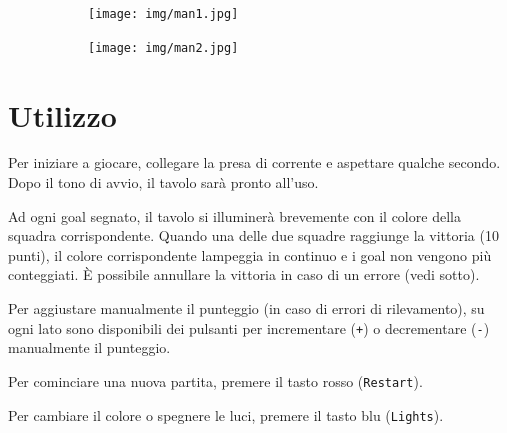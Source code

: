 \documentclass[12pt]{article}
\begin{document}
      	\begin{figure}[H]
        		\begin{subfigure}{0.5\textwidth}
                \texttt{[image: img/man1.jpg]}
        \end{subfigure}
        \begin{subfigure}{0.5\textwidth}
                \texttt{[image: img/man2.jpg]}
         \end{subfigure}
	\end{figure}
		
		

\section{Utilizzo}

	Per iniziare a giocare, collegare la presa di corrente e aspettare qualche secondo. Dopo il tono di avvio, il tavolo sarà pronto all'uso.
	
	Ad ogni goal segnato, il tavolo si illuminerà brevemente con il colore della squadra corrispondente. Quando una delle due squadre raggiunge la vittoria (10 punti), il colore corrispondente lampeggia in continuo e i goal non vengono più conteggiati. È possibile annullare la vittoria in caso di un errore (vedi sotto).
	
	Per aggiustare manualmente il punteggio (in caso di errori di rilevamento), su ogni lato sono disponibili dei pulsanti per incrementare (\texttt{+}) o decrementare (\texttt{-}) manualmente il punteggio.
	
	Per cominciare una nuova partita, premere il tasto rosso (\texttt{Restart}).
	
	Per cambiare il colore o spegnere le luci, premere il tasto blu (\texttt{Lights}).
	
\end{document}
